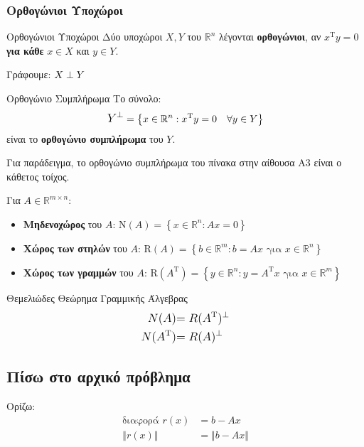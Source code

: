 \documentclass[11pt,a4paper,notitlepage,fleqn]{article}
\begin{document}
	\subsubsection{Ορθογώνιοι Υποχώροι}
	\begin{defn}{Ορθογώνιοι Υποχώροι}{}
		Δύο υποχώροι \( X,Y \) του  \( \mathbb R^n \) λέγονται
		\textbf{ορθογώνιοι}, αν \( x^{\mathrm T}y = 0 \) \textbf{για
		κάθε} \( x \in X \) και \( y \in Y \).
	
	    Γράφουμε: \( \mathlarger{X \perp Y} \)
	\end{defn}
	\begin{defn}{Ορθογώνιο Συμπλήρωμα}{}
		Το σύνολο:
		\[
		\mathlarger{
			Y^\perp
			} = \left\lbrace 
			x \in \mathbb R^n : x^{\mathrm T}y = 0 \quad
			\forall y \in Y
			 \right\rbrace
		\]
		είναι το \textbf{ορθογώνιο συμπλήρωμα} του \( Y \).
		
		Για παράδειγμα, το ορθογώνιο συμπλήρωμα του πίνακα στην αίθουσα
		Α3 είναι ο κάθετος τοίχος.
	\end{defn}
	\begin{defn}{}{}
		Για \( A \in \mathbb R^{m \times n} \):
		\begin{itemize}
			\item \textbf{Μηδενοχώρος} του \( A \):
			\( \mathrm N(A) = \left\lbrace x\in\mathbb R^n: Ax=0
			 \right\rbrace \)
			\item \textbf{Χώρος των στηλών} του \( A \):
			\( \mathrm R(A)  = \left\lbrace
			b \in \mathbb R^m: b = Ax \text{ για }
			x \in \mathbb R^n \right\rbrace
			\)
			\item \textbf{Χώρος των γραμμών} του \( A \):
			\( \mathrm R(A^{\mathrm T}) = \left\lbrace 
			y \in \mathbb R^n: y = A^{\mathrm T}x \text{ για }
			x \in \mathbb R^m
			 \right\rbrace \)
		\end{itemize}
	\end{defn}
	\begin{theorem}{Θεμελιώδες Θεώρημα Γραμμικής Άλγεβρας}{}
		\begin{align*}
			\mathlarger{N(A)} &\mathlarger{= R(A^{\mathrm T})^\perp}
			\\
			\mathlarger{N(A^{\mathrm T})} &\mathlarger{= R(A)^\perp}
		\end{align*}
	\end{theorem}

    \subsection{Πίσω στο αρχικό πρόβλημα}
    Ορίζω:
    \begin{align*}
    \text{διαφορά } r(x) &= b - Ax \\
    \left\Vert r(x)\right\Vert &= \Vert b-Ax\Vert
    \end{align*}
    
\end{document}
